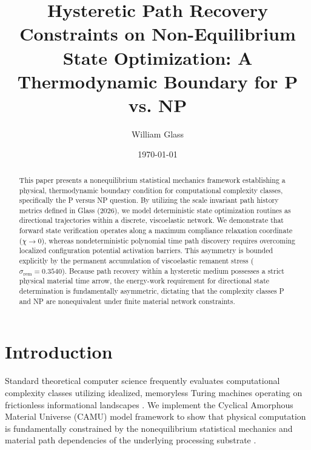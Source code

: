 \documentclass[reprint,amsmath,amssymb,aps,prd,nofootinbib]{revtex4-2}
\begin{document}

\title{Hysteretic Path Recovery Constraints on Non-Equilibrium State Optimization: A Thermodynamic Boundary for P vs. NP}

\author{William Glass}

\date{\today}

\begin{abstract}
This paper presents a nonequilibrium statistical mechanics framework establishing a physical, thermodynamic boundary condition for computational complexity classes, specifically the P versus NP question. By utilizing the scale invariant path history metrics defined in Glass (2026), we model deterministic state optimization routines as directional trajectories within a discrete, viscoelastic network. We demonstrate that forward state verification operates along a maximum compliance relaxation coordinate ($\chi \to 0$), whereas nondeterministic polynomial time path discovery requires overcoming localized configuration potential activation barriers. This asymmetry is bounded explicitly by the permanent accumulation of viscoelastic remanent stress ($\sigma_{\text{rem}} = 0.3540$). Because path recovery within a hysteretic medium possesses a strict physical material time arrow, the energy-work requirement for directional state determination is fundamentally asymmetric, dictating that the complexity classes P and NP are nonequivalent under finite material network constraints.
\end{abstract}

\maketitle

\section{Introduction}
Standard theoretical computer science frequently evaluates computational complexity classes utilizing idealized, memoryless Turing machines operating on frictionless informational landscapes \cite{anderson1972}. We implement the Cyclical Amorphous Material Universe (CAMU) model framework to show that physical computation is fundamentally constrained by the nonequilibrium statistical mechanics and material path dependencies of the underlying processing substrate \cite{jaynes1957, martyushev2006}.
\end{document}

